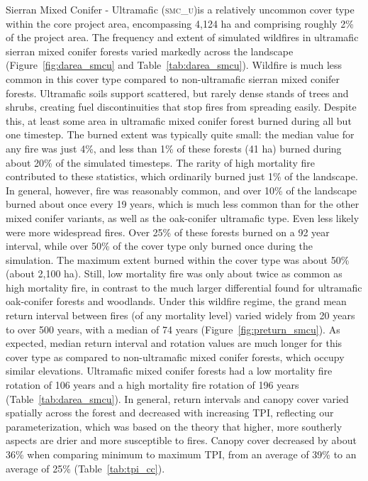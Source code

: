 Sierran Mixed Conifer - Ultramafic (\textsc{smc\_u})is a relatively uncommon cover type within the core project area, encompassing 4,124 ha and comprising roughly 2\% of the project area. The frequency and extent of simulated wildfires in ultramafic sierran mixed conifer forests varied markedly across the landscape (Figure~\ref{fig:darea_smcu} and Table~\ref{tab:darea_smcu}).  %
%
Wildfire is much less common in this cover type compared to non-ultramafic sierran mixed conifer forests. Ultramafic soils support scattered, but rarely dense stands of trees and shrubs, creating fuel discontinuities that stop fires from spreading easily. Despite this, at least some area in ultramafic mixed conifer forest burned during all but one timestep. The burned extent was typically quite small: the median value for any fire was just 4\%, and less than 1\% of these forests (41 ha) burned during about 20\% of the simulated timesteps. The rarity of high mortality fire contributed to these statistics, which ordinarily burned just 1\% of the landscape. In general, however, fire was reasonably common, and over 10\% of the landscape burned about once every 19 years, which is much less common than for the other mixed conifer variants, as well as the oak-conifer ultramafic type. Even less likely were more widespread fires. Over 25\% of these forests burned on a 92 year interval, while over 50\% of the cover type only burned once during the simulation. The maximum extent burned within the cover type was about 50\% (about 2,100 ha). Still, low mortality fire was only about twice as common as high mortality fire, in contrast to the much larger differential found for ultramafic oak-conifer forests and woodlands. %
%
Under this wildfire regime, the grand mean return interval between fires (of any mortality level) varied widely from 20 years to over 500 years, with a median of 74 years (Figure~\ref{fig:preturn_smcu}). As expected, median return interval and rotation values are much longer for this cover type as compared to non-ultramafic mixed conifer forests, which occupy similar elevations. Ultramafic mixed conifer forests had a low mortality fire rotation of 106 years and a high mortality fire rotation of 196 years (Table~\ref{tab:darea_smcu}).  %
%
In general, return intervals and canopy cover varied spatially across the forest and decreased with increasing TPI, reflecting our parameterization, which was based on the theory that higher, more southerly aspects are drier and more susceptible to fires. Canopy cover decreased by about 36\% when comparing minimum to maximum TPI, from an average of 39\% to an average of 25\% (Table~\ref{tab:tpi_cc}). 


